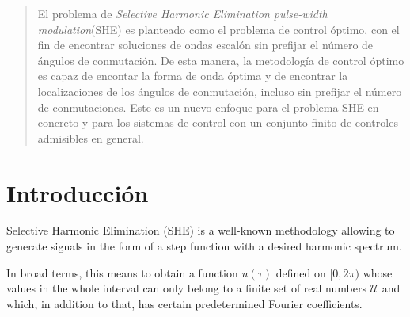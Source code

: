 
\begin{abstract}
    El problema de \emph{Selective Harmonic Elimination pulse-width modulation}(SHE) es planteado como el problema de control óptimo, con el fin de encontrar soluciones de ondas escalón sin prefijar el número de ángulos de conmutación. De esta manera, la metodología de control óptimo es capaz de encontar la forma de onda óptima y de encontrar la localizaciones de los ángulos de conmutación, incluso sin prefijar el número de conmutaciones. Este es un nuevo enfoque para el problema SHE en concreto y para los sistemas de control con un conjunto finito de controles admisibles en general.
    
\end{abstract}
\tableofcontents


\section{Introducción} 
 

Selective Harmonic Elimination (SHE) \cite{Rodriguez2002} is a well-known methodology allowing to generate signals in the form of a step function with a desired harmonic spectrum. 

In broad terms, this means to obtain a function $u(\tau)$ defined on $[0,2\pi)$ whose values in the whole interval can only belong to a finite set of real numbers $\mathcal{U}$ and which, in addition to that, has certain predetermined Fourier coefficients. 

